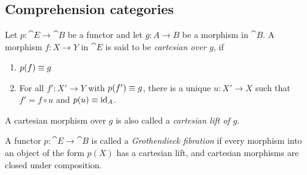 \begin{comment}
Note first that for any $A\in\cat{F}/\Gamma$, $W_A$ is
contravariant in $A$ and that it preserves the terminal object. 

Now let $\theta:\Delta\to\ctxext{\Gamma}{A}$ so that $A\circ\theta\jdeq f$
for some $f:\Delta\to\Gamma$. Then we have $\zeta_{A,f}(\theta)\in T(f_\ast(A))$.  
We wish to define $\theta_\ast(\idtm{A}):\Delta\to\ctxext{\Delta}{f_\ast(A)}$

for any $A\in\cat{F}/\Gamma$ and $Q\in\cat{F}/\ctxext{\Gamma}{B}$, we have
\begin{align*}
T(B) 
  & \jdeq 
\{ \eta : \Gamma \to\ctxext{\Gamma}{B}
        \mid B\circ\eta\jdeq\catid{\Gamma}\}
  \\
T(W_A(B))
  & \jdeq
\{ \eta : \ctxext{\Gamma}{A}\to\ctxext{{\Gamma}{A}}{W_A(B)}
        \mid W_A(B)\circ\eta\jdeq\catid{\ctxext{\Gamma}{A}}\}
  \\
  & \cong
\{ \theta : \ctxext{\Gamma}{A}\to\ctxext{\Gamma}{B}\mid B\circ\theta\jdeq A\}
\end{align*}
Therefore, $\eta\mapsto \zeta_{B,A}(\eta\circ A)$ defines a function from
$T(B)$ to $T(W_A(B))$. 
\end{proof}
\end{comment}

\subsection{Comprehension categories}

\begin{defn}
Let $p:\cat{E}\to\cat{B}$ be a functor and let $g:A\to B$ be a morphism in $\cat{B}$.
A morphism $f:X\to Y$ in $\cat{E}$ is said to be \emph{cartesian over $g$}, if
\begin{enumerate}
\item $p(f)\equiv g$
\item For all $f':X'\to Y$ with $p(f')\equiv g$, there is a unique $u:X'\to X$
such that $f'=f\circ u$ and $p(u)\equiv{\mathrm{id}_{A}}$. 
\end{enumerate}
A cartesian morphism over $g$ is also called a \emph{cartesian lift of $g$}.
\end{defn}

\begin{defn}
A functor $p:\cat{E}\to\cat{B}$ is called a \emph{Grothendieck fibration} if
every morphism into an object of the form $p(X)$ has a cartesian lift, 
and cartesian morphisms are closed under composition.
\end{defn}

